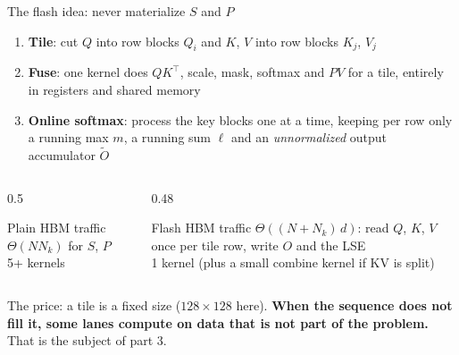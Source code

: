 \documentclass[aspectratio=169,11pt]{beamer}
\begin{document}
\begin{frame}{The flash idea: never materialize $S$ and $P$}
\begin{enumerate}
\item \textbf{Tile}: cut $Q$ into row blocks $Q_i$ and $K$, $V$ into row blocks $K_j$, $V_j$
\item \textbf{Fuse}: one kernel does $QK^\top$, scale, mask, softmax and $PV$ for a tile, entirely in registers and shared memory
\item \textbf{Online softmax}: process the key blocks one at a time, keeping per row only a running max $m$, a running sum $\ell$ and an \emph{unnormalized} output accumulator $\tilde O$
\end{enumerate}
\vspace{2mm}
\begin{columns}[T]
\begin{column}{0.5\textwidth}
\begin{block}{Plain}\small
HBM traffic $\Theta(N N_k)$ for $S$, $P$\\
5+ kernels
\end{block}
\end{column}
\begin{column}{0.48\textwidth}
\begin{block}{Flash}\small
HBM traffic $\Theta((N+N_k)\,d)$: read $Q$, $K$, $V$ once per tile row, write $O$ and the LSE\\
1 kernel (plus a small combine kernel if KV is split)
\end{block}
\end{column}
\end{columns}
\vspace{2mm}
\small The price: a tile is a fixed size ($128\times128$ here). \textbf{When the sequence does not fill it, some lanes compute on data that is not part of the problem.} That is the subject of part 3.
\end{frame}
\end{document}
